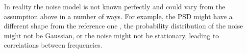 \documentclass[%
 reprint,
superscriptaddress,
nofootinbib,
 amsmath,amssymb,
 aps,
colorlinks = true, 
linkcolor = blue, 
urlcolor = blue, 
citecolor = blue, 
anchorcolor = blue,
]{revtex4-2}
\begin{document}
In reality the noise model is not known perfectly and could vary from the assumption above in a number of ways. For example, the PSD might have a different shape from the reference one \cite{babak2021lisa}, the probability distribution of the noise might not be Gaussian, or the noise might not be stationary, leading to correlations between frequencies. 



\end{document}
